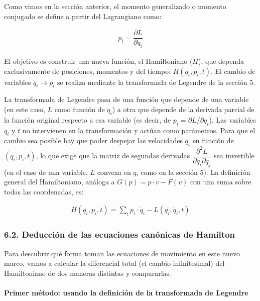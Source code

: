 \documentclass[
  spanish,
]{article}
\begin{document}
Como vimos en la sección anterior, el momento generalizado o momento
conjugado se define a partir del Lagrangiano como:

\[
\begin{aligned}
p_i = \dfrac{\partial L}{\partial \dot{q}_i}
\end{aligned}
\]

El objetivo es construir una nueva función, el Hamiltoniano (\(H\)), que
dependa exclusivamente de posiciones, momentos y del tiempo:
\(H(q_i, p_i, t)\). El cambio de variables \(\dot{q}_i \to p_i\) se
realiza mediante la transformada de Legendre de la sección 5.

La transformada de Legendre pasa de una función que depende de una
variable (en este caso, \(L\) como función de \(\dot{q}_i\)) a otra que
depende de la derivada parcial de la función original respecto a esa
variable (es decir, de \(p_i = \partial L/\partial \dot{q}_i\)). Las
variables \(q_i\) y \(t\) no intervienen en la transformación y actúan
como parámetros. Para que el cambio sea posible hay que poder despejar
las velocidades \(\dot{q}_i\) en función de \((q_i, p_i, t)\), lo que
exige que la matriz de segundas derivadas
\(\dfrac{\partial^2 L}{\partial \dot{q}_i \partial \dot{q}_j}\) sea
invertible (en el caso de una variable, \(L\) convexa en \(\dot{q}\),
como en la sección 5). La definición general del Hamiltoniano, análoga a
\(G(p) = p \cdot v - F(v)\) con una suma sobre todas las coordenadas,
es:

\[
\begin{aligned}
H(q_i, p_i, t) = \sum_{i} p_i \cdot \dot{q}_i - L(q_i, \dot{q}_i, t)
\end{aligned}
\]

\subsubsection{6.2. Deducción de las ecuaciones canónicas de
Hamilton}\label{deducciuxf3n-de-las-ecuaciones-canuxf3nicas-de-hamilton}

Para descubrir qué forma toman las ecuaciones de movimiento en este
nuevo marco, vamos a calcular la diferencial total (el cambio
infinitesimal) del Hamiltoniano de dos maneras distintas y compararlas.

\paragraph{Primer método: usando la definición de la transformada de
Legendre}\label{primer-muxe9todo-usando-la-definiciuxf3n-de-la-transformada-de-legendre}
\end{document}
